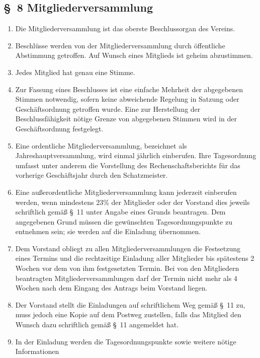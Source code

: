 \documentclass[10pt,a4paper]{scrartcl}
\begin{document}
\subsection*{\S \ 8 Mitgliederversammlung}
\begin{enumerate}

        \item Die Mitgliederversammlung ist das oberste Beschlussorgan des Vereins.
	\item Beschl{\"u}sse werden von der Mitgliederversammlung durch {\"o}ffentliche Abstimmung getroffen.
		Auf Wunsch eines Mitglieds ist geheim abzustimmen.
	\item Jedes Mitglied hat genau eine Stimme.
	\item Zur Fassung eines Beschlusses ist eine einfache Mehrheit der abgegebenen Stimmen
             not\-wen\-dig, sofern keine abweichende Regelung in Satzung oder Gesch{\"a}ftsordnung getroffen wurde.
			 Eine zur Herstellung der Beschlussf{\"a}higkeit n{\"o}tige Grenze von abgegebenen Stimmen wird in der
			 Gesch{\"a}ftsordnung festgelegt.
	\item Eine ordentliche Mitgliederversammlung, bezeichnet als Jahreshauptversammlung,
		wird einmal j{\"a}hrlich einberufen. Ihre Tagesordnung umfasst unter anderem die
		Vorstellung des Rechenschaftsberichts f{\"u}r das vorherige Gesch{\"a}ftsjahr durch
		den Schatzmeister.
	\item Eine au{\ss}erordentliche Mitgliederversammlung kann jederzeit einberufen werden, wenn
		mindestens 23\% der Mitglieder oder der Vorstand dies jeweils schriftlich gem{\"a}{\ss} \S \ 11
		unter Angabe eines Grunds beantragen. Dem angegebenen Grund m{\"u}ssen die gew{\"u}nschten
		Tagesordnungspunkte zu entnehmen sein; sie werden auf die Einladung {\"u}bernommen.
	\item Dem Vorstand obliegt zu allen Mitgliederversammlungen die Festsetzung eines Termins
		und die rechtzeitige Einladung aller Mitglieder bis sp{\"a}testens 2 Wochen vor dem
		von ihm festgesetzten Termin. Bei von den Mitgliedern beantragten
                Mitgliederversammlungen darf der Termin nicht mehr als 4 Wochen nach dem Eingang
		des Antrags beim Vorstand liegen.
	\item Der Vorstand stellt die Einladungen auf schriftlichem Weg gem{\"a}{\ss} \S \ 11 zu, muss
		jedoch eine Kopie auf dem Postweg zustellen, falls das Mitglied den Wunsch dazu
		schriftlich gem{\"a}{\ss} \S \ 11 angemeldet hat.
	\item In der Einladung werden die Tagesordnungspunkte sowie weitere n{\"o}tige Informationen

\end{enumerate}
\end{document}

